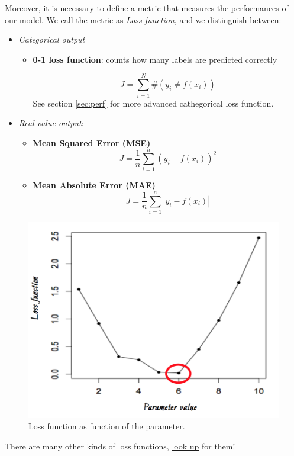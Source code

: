 Moreover, it is necessary to define a metric that measures the performances of our model. We call the metric as \emph{Loss function}, and we distinguish between:
\begin{itemize}
\item \emph{Categorical output}
\begin{itemize}
\item \textbf{0-1 loss function}: counts how many labels are predicted correctly

$$J = \sum_{i=1}^{N} \#(y_i \neq f(x_i))$$
See section \ref{sec:perf} for more advanced cathegorical loss function.
\end{itemize}
\item \emph{Real value output}: 

\begin{itemize}
\item \textbf{Mean Squared Error (MSE)}
$$J = \frac{1}{n}\sum_{i=1}^{n} (y_i -  f(x_i))^2$$
\item \textbf{Mean Absolute Error (MAE)}
$$J = \frac{1}{n}\sum_{i=1}^{n} |y_i -  f(x_i)|$$
\end{itemize}

\end{itemize}

\begin{figure}[H]%
 \centering
 \includegraphics[width=13cm]{./img/08/loss_parameter}
 \caption{\label{pic:loss_parameter} Loss function as function of the parameter.}
\end{figure}

There are many other kinds of loss functions, \href{https://en.wikipedia.org/wiki/Loss_function}{look up} for them!


